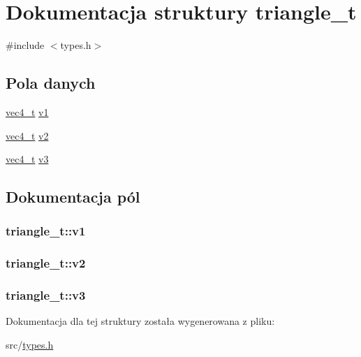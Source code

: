 \hypertarget{structtriangle__t}{\section{Dokumentacja struktury triangle\-\_\-t}
\label{structtriangle__t}
}


{\ttfamily \#include $<$types.\-h$>$}

\subsection*{Pola danych}
\begin{DoxyCompactItemize}
\item 
\hyperlink{structvec4__t}{vec4\-\_\-t} \hyperlink{structtriangle__t_a7ec1e9b758a0cbbfc5bf83643d982f6e}{v1}
\item 
\hyperlink{structvec4__t}{vec4\-\_\-t} \hyperlink{structtriangle__t_a1ba304cfe2eea84f7f783b2dbf80bd99}{v2}
\item 
\hyperlink{structvec4__t}{vec4\-\_\-t} \hyperlink{structtriangle__t_add5dcbf2f6f4df30afc1d722cc982e25}{v3}
\end{DoxyCompactItemize}


\subsection{Dokumentacja pól}
\hypertarget{structtriangle__t_a7ec1e9b758a0cbbfc5bf83643d982f6e}{
\subsubsection[{v1}]{ triangle\-\_\-t\-::v1}}\label{structtriangle__t_a7ec1e9b758a0cbbfc5bf83643d982f6e}
\hypertarget{structtriangle__t_a1ba304cfe2eea84f7f783b2dbf80bd99}{
\subsubsection[{v2}]{ triangle\-\_\-t\-::v2}}\label{structtriangle__t_a1ba304cfe2eea84f7f783b2dbf80bd99}
\hypertarget{structtriangle__t_add5dcbf2f6f4df30afc1d722cc982e25}{
\subsubsection[{v3}]{ triangle\-\_\-t\-::v3}}\label{structtriangle__t_add5dcbf2f6f4df30afc1d722cc982e25}


Dokumentacja dla tej struktury została wygenerowana z pliku\-:\begin{DoxyCompactItemize}
\item 
src/\hyperlink{types_8h}{types.\-h}\end{DoxyCompactItemize}
